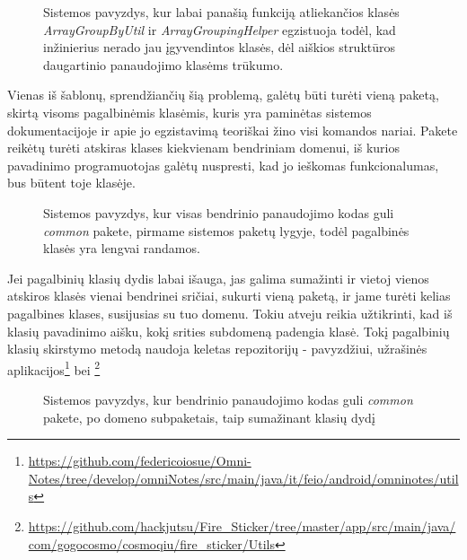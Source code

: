 \begin{figure}[H]
\snugshade
{}
\endsnugshade
\caption{Sistemos pavyzdys, kur labai panašią funkciją atliekančios klasės \textit{ArrayGroupByUtil} ir \textit{ArrayGroupingHelper}
egzistuoja todėl, kad inžinierius nerado jau įgyvendintos klasės, dėl aiškios struktūros daugartinio
panaudojimo klasėms trūkumo.}
\end{figure}
Vienas iš šablonų, sprendžiančių šią problemą, galėtų būti turėti vieną paketą, skirtą visoms pagalbinėmis klasėmis, kuris yra paminėtas sistemos
dokumentacijoje ir apie jo egzistavimą teoriškai žino visi komandos nariai.
Pakete reikėtų turėti atskiras klases kiekvienam bendriniam domenui, iš kurios pavadinimo programuotojas galėtų nuspresti,
kad jo ieškomas funkcionalumas, bus būtent toje klasėje.

\begin{figure}[H]
\snugshade
{}
\endsnugshade
\caption{Sistemos pavyzdys, kur visas bendrinio panaudojimo kodas guli \textit{common} pakete, pirmame sistemos paketų lygyje, todėl
pagalbinės klasės yra lengvai randamos.}
\end{figure}

Jei pagalbinių klasių dydis labai išauga, jas galima sumažinti ir vietoj vienos atskiros klasės vienai bendrinei sričiai, sukurti vieną paketą,
ir jame turėti kelias pagalbines klases, susijusias su tuo domenu.
Tokiu atveju reikia užtikrinti, kad iš klasių pavadinimo aišku, kokį srities subdomeną padengia klasė.
Tokį pagalbinių klasių skirstymo metodą naudoja keletas repozitorijų - pavyzdžiui, užrašinės aplikacijos\footnote{\url{https://github.com/federicoiosue/Omni-Notes/tree/develop/omniNotes/src/main/java/it/feio/android/omninotes/utils}} bei
\footnote{\url{https://github.com/hackjutsu/Fire_Sticker/tree/master/app/src/main/java/com/gogocosmo/cosmoqiu/fire_sticker/Utils}}

\begin{figure}[H]
\snugshade
{}
\endsnugshade
\caption{Sistemos pavyzdys, kur bendrinio panaudojimo kodas guli \textit{common} pakete, po domeno subpaketais, taip sumažinant klasių dydį }
\end{figure}


